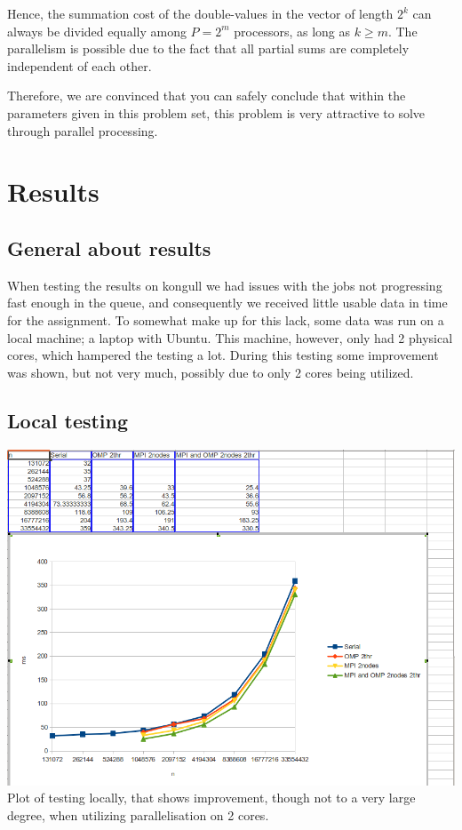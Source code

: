 \documentclass[fontsize=11pt,paper=a4,titlepage]{report}
\begin{document}
Hence, the summation cost of the double-values in the vector of length $2^k$ can
always be divided equally among $P = 2^m$ processors, as long as $k\geq m$. The
parallelism is possible due to the fact that all partial sums are completely
independent of each other.

Therefore, we are convinced that you can safely conclude that within the
parameters given in this problem set, this problem is very attractive to solve
through parallel processing.

\section{Results}

\subsection{General about results}
When testing the results on kongull we had issues with the jobs not progressing fast enough in the queue, and consequently we received little usable data in time for the assignment.
To somewhat make up for this lack, some data was run on a local machine; a laptop with Ubuntu. This machine, however, only had 2 physical cores, which hampered the testing a lot. During this testing some improvement was shown, but not very much, possibly due to only 2 cores being utilized.

\subsection{Local testing}
\includegraphics[scale=0.6]{local_data_plot.png}
Plot of testing locally, that shows improvement, though not to a very large degree, when utilizing parallelisation on 2 cores.
\end{document}
